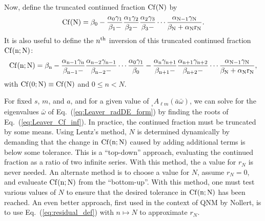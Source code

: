 \documentclass[11pt]{article}
\newcommand{\scA}[4][]{{}_{{}_{#2}}A^{#1}_{#3}(#4)}
\begin{document}
Now, define the truncated continued fraction $\rm{Cf}(N)$ by
\begin{equation}\label{eq:Leaver_Cf_N}
  \rm{Cf}(N) = \beta_0 -\frac{\alpha_0\gamma_1}{\beta_1-}
             \frac{\alpha_1\gamma_2}{\beta_2-}
             \frac{\alpha_2\gamma_3}{\beta_3-}\cdots
             \frac{\alpha_{N-1}\gamma_N}{\beta_N+\alpha_N r_N}.
\end{equation}
It is also useful to define the $n^{\rm th}$ inversion of this
truncated continued fraction $\rm{Cf}(n;N)$:
\begin{equation}\label{eq:Leaver_Cf_N_inv}
  \rm{Cf}(n;N) = \beta_n-\frac{\alpha_{n-1}\gamma_n}{\beta_{n-1}-}
                         \frac{\alpha_{n-2}\gamma_{n-1}}{\beta_{n-2}-}
                         \cdots\frac{\alpha_0\gamma_1}{\beta_0}
                         -\frac{\alpha_n\gamma_{n+1}}{\beta_{n+1}-}
                          \frac{\alpha_{n+1}\gamma_{n+2}}{\beta_{n+2}-}
                          \cdots\frac{\alpha_{N-1}\gamma_N}{\beta_N+\alpha_N r_N},
\end{equation}
with $\rm{Cf}(0;N)\equiv\rm{Cf}(N)$ and $0\le n<N$.

For fixed $s$, $m$, and $a$, and for a given value of
$\scA{s}{\ell{m}}{\bar{a}\bar\omega}$, we can solve for the
eigenvalues $\bar\omega$ of Eq.~(\ref{eq:Leaver_radDE_form}) by
finding the roots of Eq.~(\ref{eq:Leaver_Cf_inf}).  In practice, the
continued fraction must be truncated by some means.  Using Lentz's
method, $N$ is determined dynamically by demanding that the change in
$\rm{Cf}(n;N)$ caused by adding additional terms is below some
tolerance.  This is a ``top-down'' approach, evaluating the continued
fraction as a ratio of two infinite series.  With this method, the a
value for $r_N$ is never needed.  An alternate method is to choose a
value for $N$, assume $r_N=0$, and evalueate $\rm{Cf}(n;N)$ from the
``bottom-up''.  With this method, one must test various values of $N$
to ensure that the desired tolerance in $\rm{Cf}(n;N)$ has been
reached.  An even better approach, first used in the context of QNM by
Nollert, is to use Eq.~(\ref{eq:residual_def}) with $n\mapsto N$ to
approximate $r_N$.


\vspace*{0.5in}
\end{document}
